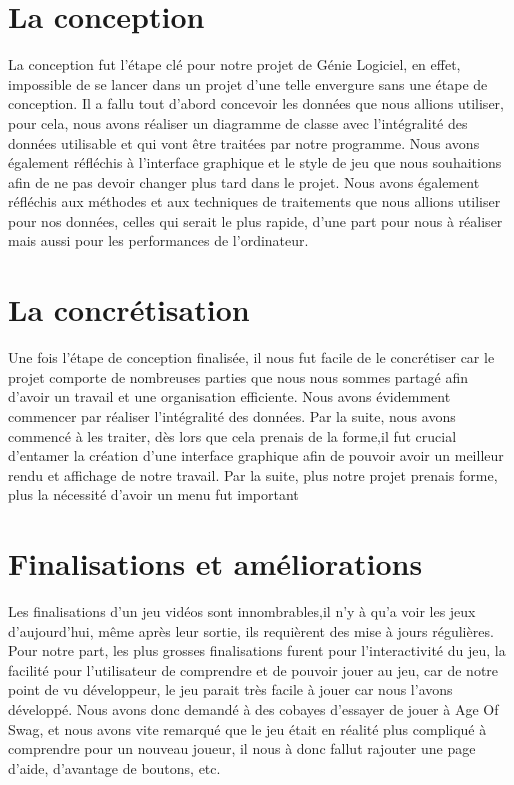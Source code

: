 \section{La conception}
La conception fut l'étape clé pour notre projet de Génie Logiciel, en effet, impossible de se lancer dans un projet d'une telle envergure sans une étape de conception.
Il a fallu tout d'abord concevoir les données que nous allions utiliser, pour cela, nous avons réaliser un diagramme de classe avec l'intégralité des données utilisable et qui vont être traitées par notre programme.
Nous avons également réfléchis à l'interface graphique et le style de jeu que nous souhaitions afin de ne pas devoir changer plus tard dans le projet.
Nous avons également réfléchis aux méthodes et aux techniques de traitements que nous allions utiliser pour nos données, celles qui serait le plus rapide, d'une part pour nous à réaliser mais aussi pour les performances de l'ordinateur.


\section{La concrétisation}

Une fois l'étape de conception finalisée, il nous fut facile de le concrétiser car le projet comporte de nombreuses parties que nous nous sommes partagé afin d'avoir un travail et une organisation efficiente.
Nous avons évidemment commencer par réaliser l'intégralité des données.
Par la suite, nous avons commencé à les traiter, dès lors que cela prenais de la forme,il fut crucial d'entamer la création d'une interface graphique afin de pouvoir avoir un meilleur rendu et affichage de notre travail.
Par la suite, plus notre projet prenais forme, plus la nécessité d'avoir un menu fut important



\section{Finalisations et améliorations}

Les finalisations d'un jeu vidéos sont innombrables,il n'y à qu'a voir les jeux d'aujourd'hui, même après leur sortie, ils requièrent des mise à jours régulières. Pour notre part, les plus grosses finalisations furent pour l'interactivité du jeu, la facilité pour l'utilisateur de comprendre et de pouvoir jouer au jeu, car de notre point de vu développeur, le jeu parait très facile à jouer car nous l'avons développé. Nous avons donc demandé à des cobayes d'essayer de jouer à Age Of Swag, et nous avons vite remarqué que le jeu était en réalité plus compliqué à comprendre pour un nouveau joueur, il nous à donc fallut rajouter une page d'aide, d'avantage de boutons, etc.

